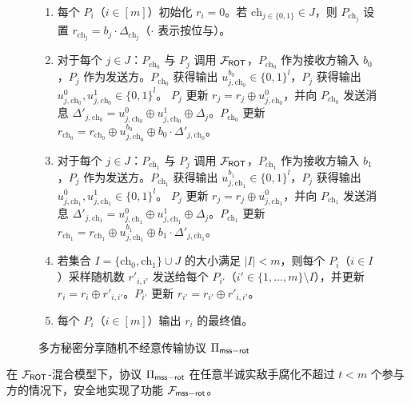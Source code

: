 \begin{figure}[!htb]
\centering
\begin{framed}
\begin{enumerate}
    \item 每个 $P_i$（$i \in [m]$）初始化 $r_i = 0$。若 $\text{ch}_{j \in \{0,1\}} \in J$，则 $P_{\text{ch}_j}$ 设置 $r_{\text{ch}_j} = b_j \cdot \Delta_{\text{ch}_j}$（$\cdot$ 表示按位与）。
    \item 对于每个 $j \in J$：$P_{\text{ch}_0}$ 与 $P_j$ 调用 $\mathcal{F}_\mathsf{ROT}$，$P_{\text{ch}_0}$ 作为接收方输入 $b_0$，$P_j$ 作为发送方。$P_{\text{ch}_0}$ 获得输出 $u_{j,{\text{ch}_0}}^{b_0} \in \{0,1\}^l$，$P_j$ 获得输出 $u_{j,{\text{ch}_0}}^0, u_{j,{\text{ch}_0}}^1 \in \{0,1\}^l$。
    $P_j$ 更新 $r_j = r_j \oplus u_{j,{\text{ch}_0}}^0$，并向 $P_{\text{ch}_0}$ 发送消息 $\Delta'_{j,{\text{ch}_0}} = u_{j,{\text{ch}_0}}^0 \oplus u_{j,{\text{ch}_0}}^1 \oplus \Delta_j$。$P_{\text{ch}_0}$ 更新 $r_{\text{ch}_0} = r_{\text{ch}_0} \oplus u_{j,{\text{ch}_0}}^{b_0} \oplus b_0 \cdot \Delta'_{j,{\text{ch}_0}}$。
    \item 对于每个 $j \in J$：$P_{\text{ch}_1}$ 与 $P_j$ 调用 $\mathcal{F}_\mathsf{ROT}$，$P_{\text{ch}_1}$ 作为接收方输入 $b_1$，$P_j$ 作为发送方。$P_{\text{ch}_1}$ 获得输出 $u_{j,{\text{ch}_1}}^{b_1} \in \{0,1\}^l$，$P_j$ 获得输出 $u_{j,{\text{ch}_1}}^0, u_{j,{\text{ch}_1}}^1 \in \{0,1\}^l$。
    $P_j$ 更新 $r_j = r_j \oplus u_{j,{\text{ch}_1}}^0$，并向 $P_{\text{ch}_1}$ 发送消息 $\Delta'_{j,{\text{ch}_1}} = u_{j,{\text{ch}_1}}^0 \oplus u_{j,{\text{ch}_1}}^1 \oplus \Delta_j$。$P_{\text{ch}_1}$ 更新 $r_{\text{ch}_1} = r_{\text{ch}_1} \oplus u_{j,{\text{ch}_1}}^{b_1} \oplus b_1 \cdot \Delta'_{j,{\text{ch}_1}}$。
    \item 若集合 $I = \{\text{ch}_0, \text{ch}_1\} \cup J$ 的大小满足 $|I| < m$，则每个 $P_i$（$i \in I$）采样随机数 $r'_{i,i'}$ 发送给每个 $P_{i'}$（$i' \in \{1, \dots, m\} \setminus I$），并更新 $r_i = r_i \oplus r'_{i,i'}$。$P_{i'}$ 更新 $r_{i'} = r_{i'} \oplus r'_{i,i'}$。
    \item 每个 $P_i$（$i \in [m]$）输出 $r_i$ 的最终值。
\end{enumerate}
\end{framed}
\caption{多方秘密分享随机不经意传输协议 $\Pi_\mathsf{mss\mathsf{-}rot}$}\label{fig:proto-mssrot}
\end{figure}

\begin{theorem}\label{theorem:mssrot}
在 $\mathcal{F}_\mathsf{ROT}$-混合模型下，协议 $\Pi_\mathsf{mss\mathsf{-}rot}$ 在任意半诚实敌手腐化不超过 $t < m$ 个参与方的情况下，安全地实现了功能 $\mathcal{F}_\mathsf{mss\mathsf{-}rot}$。
\end{theorem}

